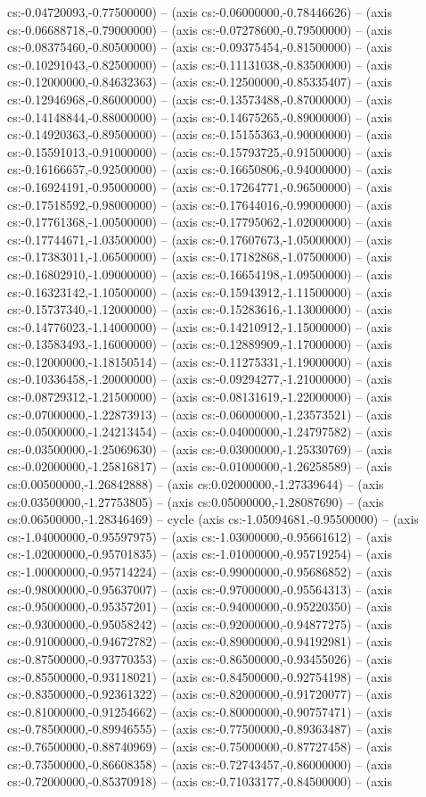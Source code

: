 cs:-0.04720093,-0.77500000) -- (axis cs:-0.06000000,-0.78446626) -- (axis cs:-0.06688718,-0.79000000) -- (axis cs:-0.07278600,-0.79500000) -- (axis cs:-0.08375460,-0.80500000) -- (axis cs:-0.09375454,-0.81500000) -- (axis cs:-0.10291043,-0.82500000) -- (axis cs:-0.11131038,-0.83500000) -- (axis cs:-0.12000000,-0.84632363) -- (axis cs:-0.12500000,-0.85335407) -- (axis cs:-0.12946968,-0.86000000) -- (axis cs:-0.13573488,-0.87000000) -- (axis cs:-0.14148844,-0.88000000) -- (axis cs:-0.14675265,-0.89000000) -- (axis cs:-0.14920363,-0.89500000) -- (axis cs:-0.15155363,-0.90000000) -- (axis cs:-0.15591013,-0.91000000) -- (axis cs:-0.15793725,-0.91500000) -- (axis cs:-0.16166657,-0.92500000) -- (axis cs:-0.16650806,-0.94000000) -- (axis cs:-0.16924191,-0.95000000) -- (axis cs:-0.17264771,-0.96500000) -- (axis cs:-0.17518592,-0.98000000) -- (axis cs:-0.17644016,-0.99000000) -- (axis cs:-0.17761368,-1.00500000) -- (axis cs:-0.17795062,-1.02000000) -- (axis cs:-0.17744671,-1.03500000) -- (axis cs:-0.17607673,-1.05000000) -- (axis cs:-0.17383011,-1.06500000) -- (axis cs:-0.17182868,-1.07500000) -- (axis cs:-0.16802910,-1.09000000) -- (axis cs:-0.16654198,-1.09500000) -- (axis cs:-0.16323142,-1.10500000) -- (axis cs:-0.15943912,-1.11500000) -- (axis cs:-0.15737340,-1.12000000) -- (axis cs:-0.15283616,-1.13000000) -- (axis cs:-0.14776023,-1.14000000) -- (axis cs:-0.14210912,-1.15000000) -- (axis cs:-0.13583493,-1.16000000) -- (axis cs:-0.12889909,-1.17000000) -- (axis cs:-0.12000000,-1.18150514) -- (axis cs:-0.11275331,-1.19000000) -- (axis cs:-0.10336458,-1.20000000) -- (axis cs:-0.09294277,-1.21000000) -- (axis cs:-0.08729312,-1.21500000) -- (axis cs:-0.08131619,-1.22000000) -- (axis cs:-0.07000000,-1.22873913) -- (axis cs:-0.06000000,-1.23573521) -- (axis cs:-0.05000000,-1.24213454) -- (axis cs:-0.04000000,-1.24797582) -- (axis cs:-0.03500000,-1.25069630) -- (axis cs:-0.03000000,-1.25330769) -- (axis cs:-0.02000000,-1.25816817) -- (axis cs:-0.01000000,-1.26258589) -- (axis cs:0.00500000,-1.26842888) -- (axis cs:0.02000000,-1.27339644) -- (axis cs:0.03500000,-1.27753805) -- (axis cs:0.05000000,-1.28087690) -- (axis cs:0.06500000,-1.28346469) -- cycle (axis cs:-1.05094681,-0.95500000) -- (axis cs:-1.04000000,-0.95597975) -- (axis cs:-1.03000000,-0.95661612) -- (axis cs:-1.02000000,-0.95701835) -- (axis cs:-1.01000000,-0.95719254) -- (axis cs:-1.00000000,-0.95714224) -- (axis cs:-0.99000000,-0.95686852) -- (axis cs:-0.98000000,-0.95637007) -- (axis cs:-0.97000000,-0.95564313) -- (axis cs:-0.95000000,-0.95357201) -- (axis cs:-0.94000000,-0.95220350) -- (axis cs:-0.93000000,-0.95058242) -- (axis cs:-0.92000000,-0.94877275) -- (axis cs:-0.91000000,-0.94672782) -- (axis cs:-0.89000000,-0.94192981) -- (axis cs:-0.87500000,-0.93770353) -- (axis cs:-0.86500000,-0.93455026) -- (axis cs:-0.85500000,-0.93118021) -- (axis cs:-0.84500000,-0.92754198) -- (axis cs:-0.83500000,-0.92361322) -- (axis cs:-0.82000000,-0.91720077) -- (axis cs:-0.81000000,-0.91254662) -- (axis cs:-0.80000000,-0.90757471) -- (axis cs:-0.78500000,-0.89946555) -- (axis cs:-0.77500000,-0.89363487) -- (axis cs:-0.76500000,-0.88740969) -- (axis cs:-0.75000000,-0.87727458) -- (axis cs:-0.73500000,-0.86608358) -- (axis cs:-0.72743457,-0.86000000) -- (axis cs:-0.72000000,-0.85370918) -- (axis cs:-0.71033177,-0.84500000) -- (axis 